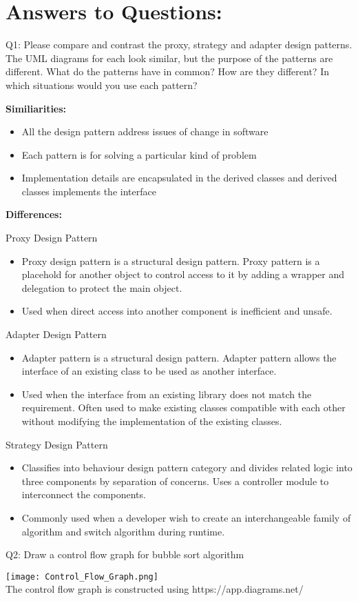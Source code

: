 \documentclass[12pt]{article}
\begin{document}
\section*{Answers to Questions:}

Q1: Please compare and contrast the proxy, strategy and adapter design
  patterns.  The UML diagrams for each look similar, but the purpose of the
  patterns are different.  What do the patterns have in common?  How are they
  different?  In which situations would you use each pattern?

\medskip
\medskip

\noindent \textbf{Similiarities:}

\begin{itemize}
  \item All the design pattern address issues of change in software
  \item Each pattern is for solving a particular kind of problem
  \item Implementation details are encapsulated in the derived classes and derived classes implements the interface
\end{itemize}

\medskip
\noindent \textbf{Differences:}

\noindent Proxy Design Pattern
\begin{itemize}
  \item Proxy design pattern is a structural design pattern. Proxy pattern is a placehold for another object to control access
        to it by adding a wrapper and delegation to protect the main object. 
  \item Used when direct access into another component is inefficient and unsafe.
\end{itemize}

\noindent Adapter Design Pattern
\begin{itemize}
  \item Adapter pattern is a structural design pattern. Adapter pattern allows the interface of an existing class 
        to be used as another interface.
  \item Used when the interface from an existing library does not match the requirement. Often used to make existing classes 
        compatible with each other without modifying the implementation of the existing classes.
\end{itemize}

\noindent Strategy Design Pattern 
\begin{itemize}
  \item Classifies into behaviour design pattern category and divides related logic into three components by separation of concerns.
        Uses a controller module to interconnect the components.
  \item Commonly used when a developer wish to create an interchangeable family of algorithm and switch algorithm during runtime.
\end{itemize}

\noindent Q2: Draw a control flow graph for bubble sort algorithm

\begin{center}
  \texttt{[image: Control\_Flow\_Graph.png]} \\
  The control flow graph is constructed using https://app.diagrams.net/
\end{center}
\end{document}
